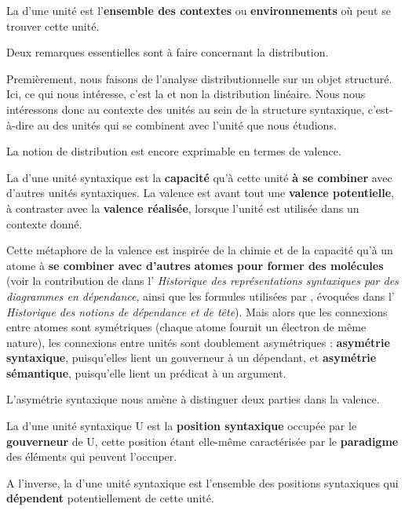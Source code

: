 {La  d’une unité est l’\textbf{ensemble des contextes} ou \textbf{environnements} où peut se trouver cette unité.}

Deux remarques essentielles sont à faire concernant la distribution.

Premièrement, nous faisons de l’analyse distributionnelle sur un objet structuré. Ici, ce qui nous intéresse, c’est la  et non la distribution linéaire. Nous nous intéressons donc au contexte des unités au sein de la structure syntaxique, c’est-à-dire au  des unités qui se combinent avec l’unité que nous étudions.

La notion de distribution est encore exprimable en termes de valence.

{La  d’une unité syntaxique est la \textbf{capacité} qu’à cette unité \textbf{à se combiner} avec d’autres unités syntaxiques. La valence est avant tout une \textbf{valence potentielle}, à contraster avec la \textbf{valence réalisée}, lorsque l’unité est utilisée dans un contexte donné.}

Cette métaphore de la valence est inspirée de la chimie et de la capacité qu’à un atome à \textbf{se combiner avec d’autres} \textbf{atomes pour former des molécules} (voir la contribution de \citet{Peirce1897} dans l’ \textit{Historique des représentations syntaxiques par des diagrammes en dépendance}, ainsi que les formules utilisées par \citet{jespersen1937analytic}, évoquées dans l’ \textit{Historique des notions de dépendance et de tête}). Mais alors que les connexions entre atomes sont symétriques (chaque atome fournit un électron de même nature), les connexions entre unités sont doublement asymétriques : \textbf{asymétrie syntaxique}, puisqu’elles lient un gouverneur à un dépendant, et \textbf{asymétrie sémantique}, puisqu’elle lient un prédicat à un argument.

L’asymétrie syntaxique nous amène à distinguer deux parties dans la valence.

{La  d’une unité syntaxique U est la \textbf{position syntaxique} occupée par le \textbf{gouverneur} de U, cette position étant elle-même caractérisée par le \textbf{paradigme} des éléments qui peuvent l’occuper.}

{A l’inverse, la  d’une unité syntaxique est l’ensemble des positions syntaxiques qui \textbf{dépendent} potentiellement de cette unité.}

